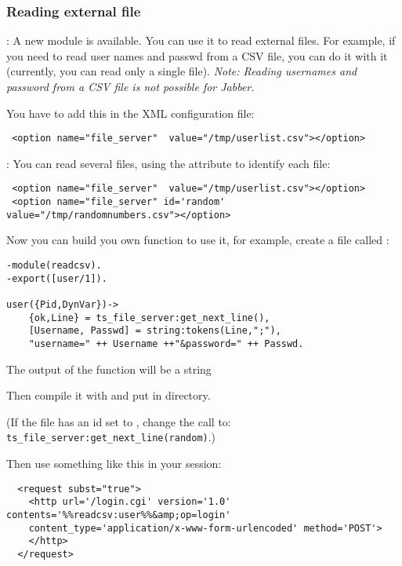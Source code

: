 \documentclass{IDXDOC-en}
\begin{document}
\subsubsection{Reading external file}
: A new  module  is available. You
can use it to read external files. For example, if you need to read user
names and passwd from a CSV file, you can do it with it (currently,
you can read only a single file). \emph{Note: Reading usernames and
password from a CSV file is not possible for Jabber.}

You have to add this in the XML configuration file:
\begin{Verbatim}
 <option name="file_server"  value="/tmp/userlist.csv"></option>
\end{Verbatim}

: You can read several files, using the 
attribute to identify each file:
\begin{Verbatim}
 <option name="file_server"  value="/tmp/userlist.csv"></option>
 <option name="file_server" id='random' value="/tmp/randomnumbers.csv"></option>
\end{Verbatim}

Now you can build you own function to use it, for example, create a
file called :

\begin{Verbatim}
-module(readcsv).
-export([user/1]).

user({Pid,DynVar})->
    {ok,Line} = ts_file_server:get_next_line(),
    [Username, Passwd] = string:tokens(Line,";"),
    "username=" ++ Username ++"&password=" ++ Passwd.
\end{Verbatim}

The output of the function will be a string 

Then compile it with  and put
 in  directory.

(If the file has an id set to , change the call to: \texttt{ts\_file\_server:get\_next\_line(random)}.)

Then use something like this in your session:

\begin{Verbatim}
  <request subst="true">
    <http url='/login.cgi' version='1.0' contents='%%readcsv:user%%&amp;op=login'
    content_type='application/x-www-form-urlencoded' method='POST'>
    </http>
  </request>
\end{Verbatim}
\end{document}
